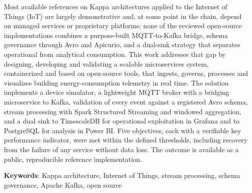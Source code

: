 Most available references on Kappa architectures applied to the Internet of Things (IoT) are largely demonstrative and, at some point in the chain, depend on managed services or proprietary platforms; none of the reviewed open-source implementations combines a purpose-built MQTT-to-Kafka bridge, schema governance through Avro and Apicurio, and a dual-sink strategy that separates operational from analytical consumption. This work addresses that gap by designing, developing and validating a scalable microservices system, containerized and based on open-source tools, that ingests, governs, processes and visualizes building energy-consumption telemetry in real time. The solution implements a device simulator, a lightweight MQTT broker with a bridging microservice to Kafka, validation of every event against a registered Avro schema, stream processing with Spark Structured Streaming and windowed aggregation, and a dual sink to TimescaleDB for operational exploitation in Grafana and to PostgreSQL for analysis in Power BI. Five objectives, each with a verifiable key performance indicator, were met within the defined thresholds, including recovery from the failure of any service without data loss. The outcome is available as a public, reproducible reference implementation.

\textbf{Keywords}: Kappa architecture, Internet of Things, stream processing, schema governance, Apache Kafka, open source